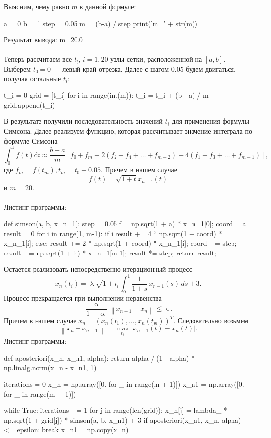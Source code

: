 \documentclass[a4paper, 12pt]{report}
\newcommand\Norm[1]{\left\| #1 \right\|}
\renewcommand{\leq}{\leqslant}
\renewcommand{\alpha}{\upalpha}
\renewcommand{\lambda}{\uplambda}
\renewcommand{\epsilon}{\upvarepsilon}
\begin{document}
			Выясним, чему равно $m$ в данной формуле:
			\begin{python}
				a = 0
				b = 1
				step = 0.05
				m = (b-a) / step
				print('m=' + str(m))\end{python} 
				Результат вывода:
				m=20.0\\\\
			Теперь рассчитаем все $t_i$, $i=\overline{1,20}$ узлы сетки, расположенной на $[a,b]$. Выберем $t_0 = 0$ --- левый край отрезка. Далее с шагом $0.05$ будем двигаться, получая остальные $t_i$:
			\begin{python}
				t_i = 0
				grid = [t_i]
				for i in range(int(m)):
					t_i = t_i + (b - a) / m
					grid.append(t_i)\end{python} 
			В результате получили последовательность значений $t_i$ для применения формулы Симсона. Далее реализуем функцию, которая рассчитывает значение интеграла по формуле Симсона $$\int_{0}^{1} f(t) \mathrm{d} t \approx \frac{b-a}{m}\left[f_{0}+f_{m}+2\left(f_{2}+f_{4}+\ldots+f_{m-2}\right)+4\left(f_{1}+f_{3}+\ldots+f_{m-1}\right)\right],$$ где $f_{m}=f\left(t_{m}\right), t_{m}=t_{0}+0.05$. Причем в нашем случае $$f(t) = \sqrt{1 + t} x_{n-1}(t)$$ и $m=20$.\\\\ Листинг программы:
			\begin{python}
				def simson(a, b, x_n_1):
					step = 0.05
					f = np.sqrt(1 + a) * x_n_1[0];
					coord = a
					result = 0
					for i in range(1, m-1):
						if i %
							result += 4 * np.sqrt(1 + coord) * x_n_1[i];
						else:
							result += 2 * np.sqrt(1 + coord) * x_n_1[i];
						coord += step;
					result += np.sqrt(1 + b) * x_n_1[m-1];
					result *= step;
					return result;\end{python} 
			Остается реализовать непосредственно итерационный процесс  
            $$x_{n}\left(t_{i}\right) = \lambda \sqrt{1 + t_i}\int_{0}^{1} \frac{1}{1 + s} \, x_{n-1}(s) \, ds + 3.$$
			Процесс прекращается при выполнении неравенства $$\dfrac{\alpha}{1 - \alpha}\Norm{x_{n-1} - x_{n}} \leq \epsilon.$$
			Причем в нашем случае $x_n = (x_n(t_1), \ldots, x_n(t_m))^T.$ Следовательно возьмем $$\Norm{x_n - x_{n+1}} = \underset{t_i}{\max}|x_{n-1}(t) - x_{n}(t)|.$$
			Листинг программы:
			\begin{python}
				def aposteriori(x_n, x_n1, alpha):
					return alpha / (1 - alpha) * np.linalg.norm(x_n - x_n1, 1)
				
				iterations = 0
				x_n = np.array([0. for _ in range(m + 1)])
				x_n1 = np.array([0. for _ in range(m + 1)])
				
				while True:
					iterations += 1
					for j in range(len(grid)):
						x_n[j] = lambda_ * np.sqrt(1 + grid[j]) * simson(a, b, x_n1) + 3
					if aposteriori(x_n1, x_n, alpha) <= epsilon:
						break
					x_n1 = np.copy(x_n)\end{python}
\end{document}

